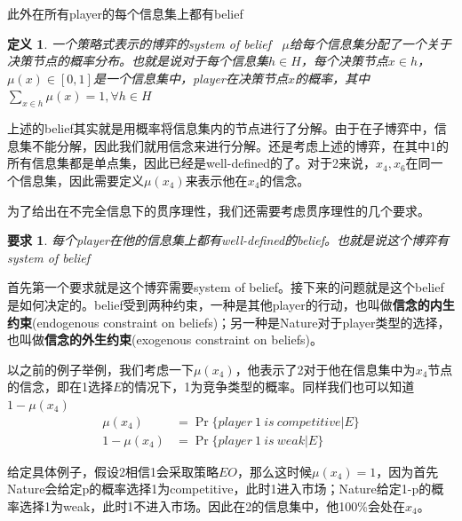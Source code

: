 \documentclass[UTF8,12pt]{ctexart}
\newtheorem{Def}{定义}[section]
\newtheorem{Req}{要求}[section]
\numberwithin{equation}{section} %
\numberwithin{figure}{section}
\numberwithin{table}{section}
\begin{document}
	此外在所有player的每个信息集上都有belief
	\begin{Def}
		一个策略式表示的博弈的system of belief \ $\mu$给每个信息集分配了一个关于决策节点的概率分布。也就是说对于每个信息集$h \in H$，每个决策节点$x \in h$，$\mu(x) \in [0,1]$是一个信息集中，player在决策节点$x$的概率，其中$\sum_{x \in h}\mu(x) = 1,\forall h \in H$
	\end{Def}
	
	上述的belief其实就是用概率将信息集内的节点进行了分解。由于在子博弈中，信息集不能分解，因此我们就用信念来进行分解。还是考虑上述的博弈，在其中1的所有信息集都是单点集，因此已经是well-defined的了。对于2来说，$x_4,x_6$在同一个信息集，因此需要定义$\mu(x_4)$来表示他在$x_4$的信念。
	
	为了给出在不完全信息下的贯序理性，我们还需要考虑贯序理性的几个要求。
	\begin{Req}
		每个player在他的信息集上都有well-defined的belief。也就是说这个博弈有system of belief
	\end{Req}

	首先第一个要求就是这个博弈需要system of belief。接下来的问题就是这个belief是如何决定的。belief受到两种约束，一种是其他player的行动，也叫做\textbf{信念的内生约束}(endogenous constraint on beliefs)；另一种是Nature对于player类型的选择，也叫做\textbf{信念的外生约束}(exogenous constraint on beliefs)。
	
	以之前的例子举例，我们考虑一下$\mu(x_4)$，他表示了2对于他在信息集中为$x_4$节点的信念，即在1选择$E$的情况下，1为竞争类型的概率。同样我们也可以知道$1 - \mu(x_4)$
	\begin{equation}
		\begin{aligned}
			\mu(x_4) &= \Pr\{player \ 1 \ is \ competitive | E\} \\
			1 - \mu(x_4) &= \Pr\{player \ 1 \ is \ weak | E\}
		\end{aligned}
	\end{equation}

	给定具体例子，假设2相信1会采取策略$EO$，那么这时候$\mu(x_4) = 1$，因为首先Nature会给定p的概率选择1为competitive，此时1进入市场；Nature给定1-p的概率选择1为weak，此时1不进入市场。因此在2的信息集中，他100\%会处在$x_4$。
	
\end{document}
